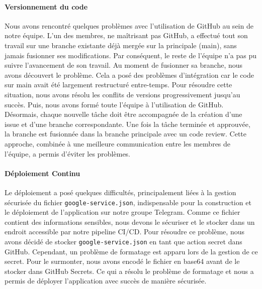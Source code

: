 \paragraph{Versionnement du code} Nous avons rencontré quelques problèmes avec l'utilisation de GitHub au sein de notre équipe. L'un des membres, ne maîtrisant pas GitHub, a effectué tout son travail sur une branche existante déjà mergée sur la principale (main), sans jamais fusionner ses modifications. Par conséquent, le reste de l'équipe n'a pas pu suivre l'avancement de son travail. Au moment de fusionner sa branche, nous avons découvert le problème. Cela a posé des problèmes d'intégration car le code sur main avait été largement restructuré entre-temps. Pour résoudre cette situation, nous avons résolu les conflits de versions progressivement jusqu'au succès. Puis, nous avons formé toute l'équipe à l'utilisation de GitHub. Désormais, chaque nouvelle tâche doit être accompagnée de la création d'une issue et d'une branche correspondante. Une fois la tâche terminée et approuvée, la branche est fusionnée dans la branche principale avec un code review. Cette approche, combinée à une meilleure communication entre les membres de l'équipe, a permis d'éviter les problèmes.

\paragraph{Déploiement Continu} Le déploiement a posé quelques difficultés, principalement liées à la gestion sécurisée du fichier \texttt{google-service.json}, indispensable pour la construction et le déploiement de l'application sur notre groupe Telegram. Comme ce fichier contient des informations sensibles, nous devons le sécuriser et le stocker dans un endroit accessible par notre pipeline CI/CD. Pour résoudre ce problème, nous avons décidé de stocker \texttt{google-service.json} en tant que action secret dans GitHub. Cependant, un problème de formatage est apparu lors de la gestion de ce secret. Pour le surmonter, nous avons encodé le fichier en base64 avant de le stocker dans GitHub Secrets. Ce qui a résolu le problème de formatage et nous a permis de déployer l'application avec succès de manière sécurisée.

